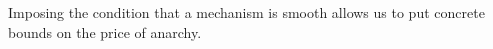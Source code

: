Imposing the condition that a mechanism is smooth allows us to put concrete bounds on the price of anarchy.

%

